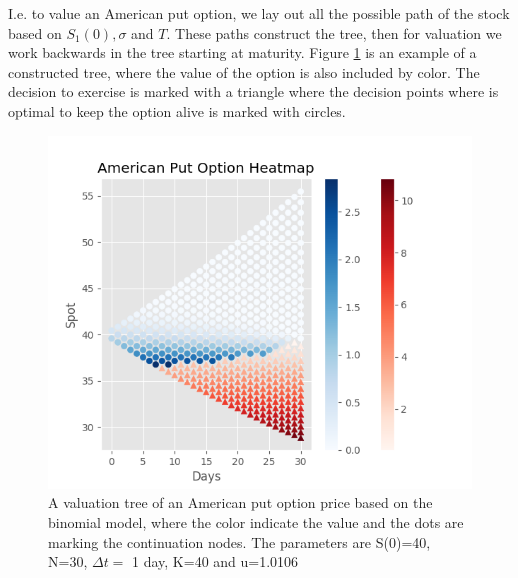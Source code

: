 I.e. to value an American put option, we lay out all the possible path of the stock based on $S_1(0),\sigma$ and $T$. These paths construct the tree, then for valuation we work backwards in the tree starting at maturity. Figure \ref{fig:BinomialTree} is an example of a constructed tree, where the value of the option is also included by color. The decision to exercise is marked with a triangle where the decision points where is optimal to keep the option alive is marked with circles. \\

\begin{figure}[th]
\centering
\includegraphics{Figures/BinomialTree.png}
\decoRule
\caption[Binomial Tree]{A valuation tree of an American put option price based on the binomial model, where the color indicate the value and the dots are marking the continuation nodes. The parameters are S(0)=40, N=30, $\Delta t =$ 1 day, K=40 and u=1.0106}
\label{fig:BinomialTree}
\end{figure}

